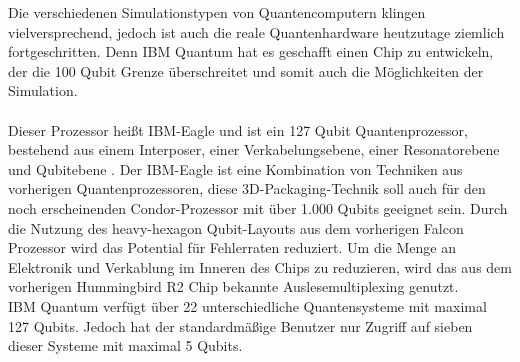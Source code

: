 Die verschiedenen Simulationstypen von Quantencomputern klingen vielversprechend, jedoch ist auch die reale Quantenhardware heutzutage ziemlich fortgeschritten. Denn IBM Quantum hat es geschafft einen Chip zu entwickeln, der die 100 Qubit Grenze \"uberschreitet und somit auch die M\"oglichkeiten der Simulation. \\\\
Dieser Prozessor hei\ss t IBM-Eagle und ist ein 127 Qubit Quantenprozessor, bestehend aus einem Interposer, einer Verkabelungsebene, einer Resonatorebene und Qubitebene \cite{IBM-Eagle}. Der IBM-Eagle ist eine Kombination von Techniken aus vorherigen Quantenprozessoren, diese 3D-Packaging-Technik soll auch f\"ur den noch erscheinenden Condor-Prozessor mit \"uber 1.000 Qubits geeignet sein. Durch die Nutzung des heavy-hexagon Qubit-Layouts \cite{heavy-hex} aus dem vorherigen Falcon Prozessor wird das Potential f\"ur Fehlerraten reduziert. Um die Menge an Elektronik und Verkablung im Inneren des Chips zu reduzieren, wird das aus dem vorherigen Hummingbird R2 Chip bekannte Auslesemultiplexing genutzt.\\
IBM Quantum verf\"ugt \"uber 22 unterschiedliche Quantensysteme mit maximal 127 Qubits. Jedoch hat der standardm\"a\ss ige Benutzer nur Zugriff auf sieben dieser Systeme mit maximal 5 Qubits.
